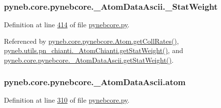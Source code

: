 \hypertarget{classpyneb_1_1core_1_1pynebcore_1_1___atom_data_ascii_ac3e956654089ac966a877dbaa003e3ea}{
\subsubsection[{\-\_\-\-Stat\-Weight}]{\setlength{\rightskip}{0pt plus 5cm}pyneb.\-core.\-pynebcore.\-\_\-\-Atom\-Data\-Ascii.\-\_\-\-Stat\-Weight\hspace{0.3cm}{\ttfamily [private]}}}\label{classpyneb_1_1core_1_1pynebcore_1_1___atom_data_ascii_ac3e956654089ac966a877dbaa003e3ea}


Definition at line \hyperlink{pynebcore_8py_source_l00414}{414} of file \hyperlink{pynebcore_8py_source}{pynebcore.\-py}.



Referenced by \hyperlink{pynebcore_8py_source_l01394}{pyneb.\-core.\-pynebcore.\-Atom.\-get\-Coll\-Rates()}, \hyperlink{pn__chianti_8py_source_l00343}{pyneb.\-utils.\-pn\-\_\-chianti.\-\_\-\-Atom\-Chianti.\-get\-Stat\-Weight()}, and \hyperlink{pynebcore_8py_source_l00514}{pyneb.\-core.\-pynebcore.\-\_\-\-Atom\-Data\-Ascii.\-get\-Stat\-Weight()}.

\hypertarget{classpyneb_1_1core_1_1pynebcore_1_1___atom_data_ascii_a5c98b93fd3ae381abca175c8baee6c0e}{
\subsubsection[{atom}]{\setlength{\rightskip}{0pt plus 5cm}pyneb.\-core.\-pynebcore.\-\_\-\-Atom\-Data\-Ascii.\-atom}}\label{classpyneb_1_1core_1_1pynebcore_1_1___atom_data_ascii_a5c98b93fd3ae381abca175c8baee6c0e}


Definition at line \hyperlink{pynebcore_8py_source_l00310}{310} of file \hyperlink{pynebcore_8py_source}{pynebcore.\-py}.



